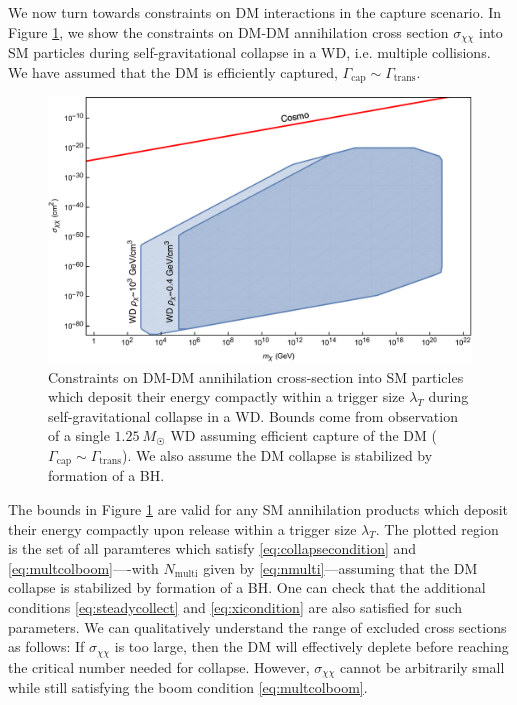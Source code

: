 \documentclass[preprintnumbers,amsmath,amssymb,prd,superscriptaddress]{revtex4}
\begin{document}
We now turn towards constraints on DM interactions in the capture scenario. 
In Figure \ref{fig:multicapture}, we show the constraints on DM-DM annihilation cross section $\sigma_{\chi \chi}$ into SM particles during self-gravitational collapse in a WD, i.e. multiple collisions.
We have assumed that the DM is efficiently captured, $\Gamma_\text{cap} \sim \Gamma_\text{trans}$. 
\begin{figure}
\includegraphics[scale=.35]{multicapture.pdf}
\caption{Constraints on DM-DM annihilation cross-section into SM particles which deposit their energy compactly within a trigger size $\lambda_T$ during self-gravitational collapse in a WD. Bounds come from observation of a single $1.25~M_{\astrosun}$ WD assuming efficient capture of the DM ($\Gamma_\text{cap} \sim \Gamma_\text{trans}$). We also assume the DM collapse is stabilized by formation of a BH.}
\label{fig:multicapture}
\end{figure}
The bounds in Figure \ref{fig:multicapture} are valid for any SM annihilation products which deposit their energy compactly upon release within a trigger size $\lambda_T$.
The plotted region is the set of all paramteres which satisfy \eqref{eq:collapsecondition} and \eqref{eq:multcolboom}----with $N_\text{multi}$ given by \eqref{eq:nmulti}---assuming that the DM collapse is stabilized by formation of a BH. 
One can check that the additional conditions \eqref{eq:steadycollect} and \eqref{eq:xicondition} are also satisfied for such parameters. 
We can qualitatively understand the range of excluded cross sections as follows:
If $\sigma_{\chi \chi}$ is too large, then the DM will effectively deplete before reaching the critical number needed for collapse.
However, $\sigma_{\chi \chi}$ cannot be arbitrarily small while still satisfying the boom condition \eqref{eq:multcolboom}. 
\end{document}
